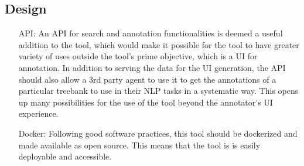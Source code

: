 \subsection{Design}
\begin{itemize}[before=\normalfont, font=\itshape, align=left]
\item[API:]
An API for search and annotation functionalities is deemed a useful addition to the tool, which would make it possible for the tool to have greater variety of uses outside the tool's prime objective, which is a UI for annotation.
In addition to serving the data for the UI generation, the API should also allow a 3rd party agent to use it to get the annotations of a particular treebank to use in their NLP tasks in a systematic way.
This opens up many possibilities for the use of the tool beyond the annotator's UI experience.

\item[Docker:]
Following good software practices, this tool should be dockerized and made available as open source.
This means that the tool is is easily deployable and accessible.
\end{itemize}
